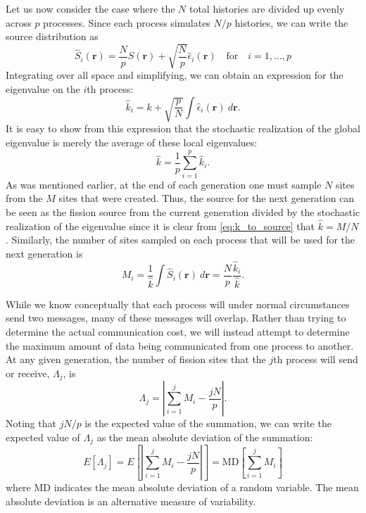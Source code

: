 Let us now consider the case where the $N$ total histories are divided up evenly
across $p$ processes. Since each process simulates $N/p$ histories, we can write
the source distribution as
\begin{equation}
  \hat{S}_i(\mathbf{r})= \frac{N}{p} S(\mathbf{r}) + \sqrt{\frac{N}{p}}
  \hat{\epsilon}_i(\mathbf{r}) \quad \text{for} \quad i = 1, \dots, p
\end{equation}
Integrating over all space and simplifying, we can obtain an expression for the
eigenvalue on the $i$th process:
\begin{equation}
  \hat{k}_i = k + \sqrt{\frac{p}{N}} \int \hat{\epsilon}_i(\mathbf{r}) \:
  d\mathbf{r}.
\end{equation}
It is easy to show from this expression that the stochastic realization of the
global eigenvalue is merely the average of these local eigenvalues:
\begin{equation}
  \label{eq:average_k_as_sum}
  \hat{k} = \frac{1}{p} \sum_{i=1}^p \hat{k}_i.
\end{equation}
As was mentioned earlier, at the end of each generation one must sample $N$
sites from the $M$ sites that were created. Thus, the source for the next
generation can be seen as the fission source from the current generation divided
by the stochastic realization of the eigenvalue since it is clear from
\eqref{eq:k_to_source} that $\hat{k} = M/N$. Similarly, the number of sites
sampled on each process that will be used for the next generation is
\begin{equation}
  \label{eq:sites_per_node}
  M_i = \frac{1}{\hat{k}} \int \hat{S}_i(\mathbf{r}) \: d\mathbf{r} =
  \frac{N}{p} \frac{\hat{k}_i}{\hat{k}}.
\end{equation}

While we know conceptually that each process will under normal circumstances
send two messages, many of these messages will overlap. Rather than trying to
determine the actual communication cost, we will instead attempt to determine
the maximum amount of data being communicated from one process to another. At
any given generation, the number of fission sites that the $j$th process will
send or receive, $\Lambda_j$, is
\begin{equation}
  \label{eq:Lambda}
  \Lambda_j = \left | \sum_{i=1}^j M_i - \frac{jN}{p} \right |.
\end{equation}
Noting that $jN/p$ is the expected value of the summation, we can write the
expected value of $\Lambda_j$ as the mean absolute deviation of the summation:
\begin{equation}
  E \left [ \Lambda_j \right ] = E \left [ \left | \sum_{i=1}^j M_i -
    \frac{jN}{p} \right | \right ] = \text{MD} \left [ \sum_{i=1}^j M_i \right ]
\end{equation}
where $\text{MD}$ indicates the mean absolute deviation of a random
variable. The mean absolute deviation is an alternative measure of variability.

